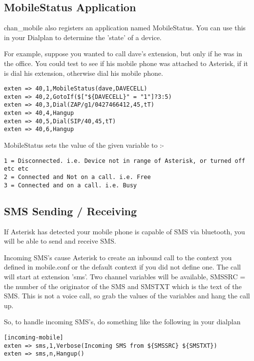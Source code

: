 \subsection{MobileStatus Application}

chan\_mobile also registers an application named MobileStatus. You can use this in your Dialplan
to determine the 'state' of a device.

For example, suppose you wanted to call dave's extension, but only if he was in the office. You could
test to see if his mobile phone was attached to Asterisk, if it is dial his extension, otherwise dial his
mobile phone.

\begin{verbatim}
exten => 40,1,MobileStatus(dave,DAVECELL)
exten => 40,2,GotoIf($["${DAVECELL}" = "1"]?3:5)
exten => 40,3,Dial(ZAP/g1/0427466412,45,tT)
exten => 40,4,Hangup
exten => 40,5,Dial(SIP/40,45,tT)
exten => 40,6,Hangup
\end{verbatim}

MobileStatus sets the value of the given variable to :-

\begin{verbatim}
1 = Disconnected. i.e. Device not in range of Asterisk, or turned off etc etc
2 = Connected and Not on a call. i.e. Free
3 = Connected and on a call. i.e. Busy
\end{verbatim}


\subsection{SMS Sending / Receiving}

If Asterisk has detected your mobile phone is capable of SMS via bluetooth, you will be able to send and
receive SMS.

Incoming SMS's cause Asterisk to create an inbound call to the context you defined in mobile.conf or the default
context if you did not define one. The call will start at extension 'sms'. Two channel variables will be available,
SMSSRC = the number of the originator of the SMS and SMSTXT which is the text of the SMS.
This is not a voice call, so grab the values of the variables and hang the call up.

So, to handle incoming SMS's, do something like the following in your dialplan

\begin{astlisting}
\begin{verbatim}
[incoming-mobile]
exten => sms,1,Verbose(Incoming SMS from ${SMSSRC} ${SMSTXT})
exten => sms,n,Hangup()
\end{verbatim}
\end{astlisting}

